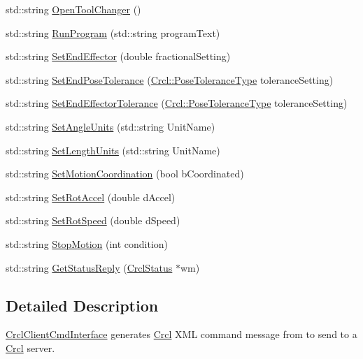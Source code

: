 \begin{DoxyCompactItemize}
std\-::string \hyperlink{classCrcl_1_1CrclClientCmdInterface_a5d9b36d71b14cc1cf0609b9d7382271e}{Open\-Tool\-Changer} ()
\item 
std\-::string \hyperlink{classCrcl_1_1CrclClientCmdInterface_a638fd866f6952e1e04f98683d67d4e3b}{Run\-Program} (std\-::string program\-Text)
\item 
std\-::string \hyperlink{classCrcl_1_1CrclClientCmdInterface_a212ce9dc24e670cc16fa250b337bad22}{Set\-End\-Effector} (double fractional\-Setting)
\item 
std\-::string \hyperlink{classCrcl_1_1CrclClientCmdInterface_a2e8c1806096fd6baf49750d96747019b}{Set\-End\-Pose\-Tolerance} (\hyperlink{namespaceCrcl_ac805071e16341b82d4fa4e12b7f3ac6f}{Crcl\-::\-Pose\-Tolerance\-Type} tolerance\-Setting)
\item 
std\-::string \hyperlink{classCrcl_1_1CrclClientCmdInterface_a1eb5274689527c8d5cf63a3e0ac46e27}{Set\-End\-Effector\-Tolerance} (\hyperlink{namespaceCrcl_ac805071e16341b82d4fa4e12b7f3ac6f}{Crcl\-::\-Pose\-Tolerance\-Type} tolerance\-Setting)
\item 
std\-::string \hyperlink{classCrcl_1_1CrclClientCmdInterface_af71197c4718712a121635ce1329233cb}{Set\-Angle\-Units} (std\-::string Unit\-Name)
\item 
std\-::string \hyperlink{classCrcl_1_1CrclClientCmdInterface_ad842b61ccc69a4db16ee035103ede8bb}{Set\-Length\-Units} (std\-::string Unit\-Name)
\item 
std\-::string \hyperlink{classCrcl_1_1CrclClientCmdInterface_ab466d17abed84f28c653bca84882256a}{Set\-Motion\-Coordination} (bool b\-Coordinated)
\item 
std\-::string \hyperlink{classCrcl_1_1CrclClientCmdInterface_ab2424f0f8fc3ed068acd37b40e976b85}{Set\-Rot\-Accel} (double d\-Accel)
\item 
std\-::string \hyperlink{classCrcl_1_1CrclClientCmdInterface_a022300fe3a3870454d2a8fb761c2b1eb}{Set\-Rot\-Speed} (double d\-Speed)
\item 
std\-::string \hyperlink{classCrcl_1_1CrclClientCmdInterface_a6e2b895f50d889aa80870c02722ffcae}{Stop\-Motion} (int condition)
\item 
std\-::string \hyperlink{classCrcl_1_1CrclClientCmdInterface_af74231a5343156060c0ab6342e794a1f}{Get\-Status\-Reply} (\hyperlink{structCrcl_1_1CrclStatus}{Crcl\-Status} $\ast$wm)
\end{DoxyCompactItemize}


\subsection{Detailed Description}
\hyperlink{classCrcl_1_1CrclClientCmdInterface}{Crcl\-Client\-Cmd\-Interface} generates \hyperlink{namespaceCrcl}{Crcl} X\-M\-L command message from to send to a \hyperlink{namespaceCrcl}{Crcl} server. 

